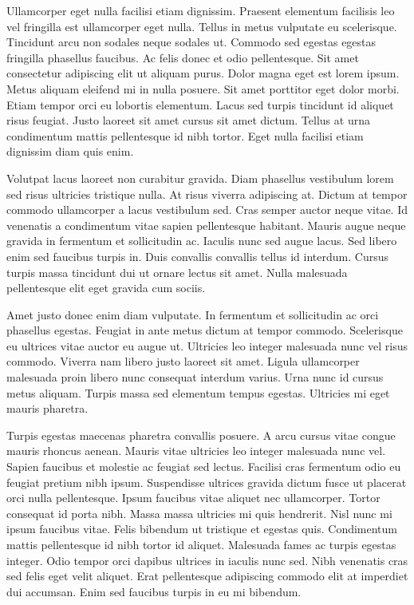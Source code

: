 \documentclass[12pt]{article}
\begin{document}
Ullamcorper eget nulla facilisi etiam dignissim. Praesent elementum facilisis leo vel fringilla est ullamcorper eget nulla. Tellus in metus vulputate eu scelerisque. Tincidunt arcu non sodales neque sodales ut. Commodo sed egestas egestas fringilla phasellus faucibus. Ac felis donec et odio pellentesque. Sit amet consectetur adipiscing elit ut aliquam purus. Dolor magna eget est lorem ipsum. Metus aliquam eleifend mi in nulla posuere. Sit amet porttitor eget dolor morbi. Etiam tempor orci eu lobortis elementum. Lacus sed turpis tincidunt id aliquet risus feugiat. Justo laoreet sit amet cursus sit amet dictum. Tellus at urna condimentum mattis pellentesque id nibh tortor. Eget nulla facilisi etiam dignissim diam quis enim.

Volutpat lacus laoreet non curabitur gravida. Diam phasellus vestibulum lorem sed risus ultricies tristique nulla. At risus viverra adipiscing at. Dictum at tempor commodo ullamcorper a lacus vestibulum sed. Cras semper auctor neque vitae. Id venenatis a condimentum vitae sapien pellentesque habitant. Mauris augue neque gravida in fermentum et sollicitudin ac. Iaculis nunc sed augue lacus. Sed libero enim sed faucibus turpis in. Duis convallis convallis tellus id interdum. Cursus turpis massa tincidunt dui ut ornare lectus sit amet. Nulla malesuada pellentesque elit eget gravida cum sociis.

Amet justo donec enim diam vulputate. In fermentum et sollicitudin ac orci phasellus egestas. Feugiat in ante metus dictum at tempor commodo. Scelerisque eu ultrices vitae auctor eu augue ut. Ultricies leo integer malesuada nunc vel risus commodo. Viverra nam libero justo laoreet sit amet. Ligula ullamcorper malesuada proin libero nunc consequat interdum varius. Urna nunc id cursus metus aliquam. Turpis massa sed elementum tempus egestas. Ultricies mi eget mauris pharetra.

Turpis egestas maecenas pharetra convallis posuere. A arcu cursus vitae congue mauris rhoncus aenean. Mauris vitae ultricies leo integer malesuada nunc vel. Sapien faucibus et molestie ac feugiat sed lectus. Facilisi cras fermentum odio eu feugiat pretium nibh ipsum. Suspendisse ultrices gravida dictum fusce ut placerat orci nulla pellentesque. Ipsum faucibus vitae aliquet nec ullamcorper. Tortor consequat id porta nibh. Massa massa ultricies mi quis hendrerit. Nisl nunc mi ipsum faucibus vitae. Felis bibendum ut tristique et egestas quis. Condimentum mattis pellentesque id nibh tortor id aliquet. Malesuada fames ac turpis egestas integer. Odio tempor orci dapibus ultrices in iaculis nunc sed. Nibh venenatis cras sed felis eget velit aliquet. Erat pellentesque adipiscing commodo elit at imperdiet dui accumsan. Enim sed faucibus turpis in eu mi bibendum.
\end{document}
